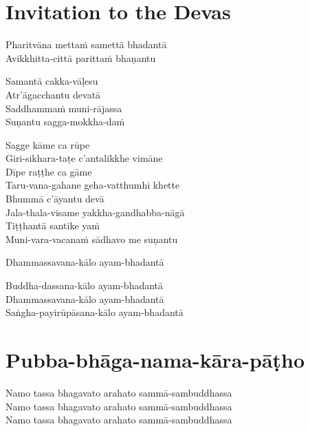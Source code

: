 
\chapter{Invitation to the Devas}%


\begin{paritta}
%
Pharitvāna mettaṁ samettā bhadantā\\
Avikkhitta-cittā parittaṁ bhaṇantu

%
Samantā cakka-vāḷesu\\
Atr'āgacchantu devatā\\
Saddhammaṁ muni-rājassa\\
Suṇantu sagga-mokkha-daṁ

Sagge kāme ca rūpe\\
Giri-sikhara-taṭe c'antalikkhe vimāne\\
Dīpe raṭṭhe ca gāme\\
Taru-vana-gahane geha-vatthumhi khette\\
Bhummā c'āyantu devā\\
Jala-thala-visame yakkha-gandhabba-nāgā\\
Tiṭṭhantā santike yaṁ\\
Muni-vara-vacanaṁ sādhavo me suṇantu

Dhammassavana-kālo ayam-bhadantā


Buddha-dassana-kālo ayam-bhadantā\\
Dhammassavana-kālo ayam-bhadantā\\
Saṅgha-payirūpāsana-kālo ayam-bhadantā
\end{paritta}

\clearpage

\chapter{Pubba-bhāga-nama-kāra-pāṭho}%


\begin{paritta}
Namo tassa bhagavato arahato sammā-sambuddhassa\\
Namo tassa bhagavato arahato sammā-sambuddhassa\\
Namo tassa bhagavato arahato sammā-sambuddhassa
\end{paritta}

